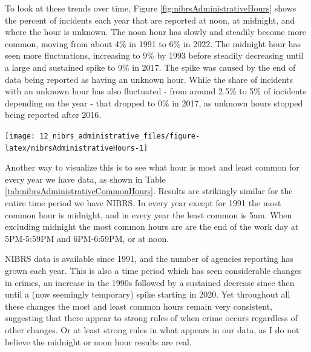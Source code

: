 \documentclass[
]{krantz}
\let\origfigure\figure
\let\endorigfigure\endfigure
\renewenvironment{figure}[1][2] {
    \expandafter\origfigure\expandafter[H]
} {
    \endorigfigure
}
\begin{document}
To look at these trends over time, Figure
\ref{fig:nibrsAdministrativeHours} shows the percent of
incidents each year that are reported at noon, at midnight,
and where the hour is unknown. The noon hour has slowly and
steadily become more common, moving from about 4\% in 1991
to 6\% in 2022. The midnight hour has seen more
fluctuations, increasing to 9\% by 1993 before steadily
decreasing until a large and sustained spike to 9\% in 2017.
The spike was caused by the end of data being reported as
having an unknown hour. While the share of incidents with an
unknown hour has also fluctuated - from around 2.5\% to 5\%
of incidents depending on the year - that dropped to 0\% in
2017, as unknown hours stopped being reported after 2016.

\begin{figure}

{\centering \texttt{[image: 12\_nibrs\_administrative\_files/figure-latex/nibrsAdministrativeHours-1]} 

}

\caption{Annual percent of incidents that occurred at midnight, noon, and at an unknown time, 1991-2022.}\label{fig:nibrsAdministrativeHours}
\end{figure}

Another way to visualize this is to see what hour is most
and least common for every year we have data, as shown in
Table \ref{tab:nibrsAdministrativeCommonHours}. Results are
strikingly similar for the entire time period we have NIBRS.
In every year except for 1991 the most common hour is
midnight, and in every year the least common is 5am. When
excluding midnight the most common hours are are the end of
the work day at 5PM-5:59PM and 6PM-6:59PM, or at noon.

NIBRS data is available since 1991, and the number of
agencies reporting has grown each year. This is also a time
period which has seen considerable changes in crimes, an
increase in the 1990s followed by a sustained decrease since
then until a (now seemingly temporary) spike starting in
2020. Yet throughout all these changes the most and least
common hours remain very consistent, suggesting that there
appear to strong rules of when crime occurs regardless of
other changes. Or at least strong rules in what appears in
our data, as I do not believe the midnight or noon hour
results are real.
\end{document}
